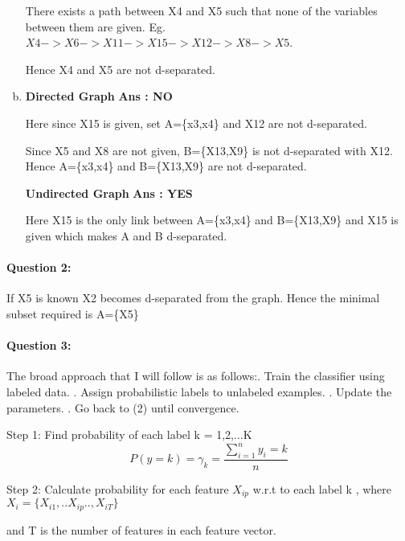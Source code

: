 \documentclass[letterpaper,11pt]{article}
\begin{document}
\begin{enumerate}[(a)]
There exists a path between X4 and X5 such that none of the variables between them are given.
Eg. $X4 -> X6 -> X11 -> X15 -> X12 -> X8 -> X5$.

Hence X4 and X5 are not d-separated.

\item
\textbf{Directed Graph}
\newline
\textbf{Ans : NO}
\newline

Here since X15 is given, set A=\{x3,x4\} and X12 are not d-separated.

Since X5 and X8 are not given, B=\{X13,X9\} is not d-separated with X12.
Hence A=\{x3,x4\} and B=\{X13,X9\} are not d-separated.

\textbf{Undirected Graph}
\newline
\textbf{Ans : YES}
\newline

Here X15 is the only link between A=\{x3,x4\} and B=\{X13,X9\} and X15 is given which makes A and B d-separated.

\end{enumerate}

\paragraph{Question 2:} 

If X5 is known X2 becomes d-separated from the graph.
Hence the minimal subset required is A=\{X5\}

\paragraph{Question 3:} 

The broad approach that I will follow is as follows:. Train the classifier using labeled data. . Assign probabilistic labels to unlabeled examples. . Update the parameters. . Go back to (2) until convergence.

Step 1:
Find probability of each label k = 1,2,...K 
\[
P(y = k) = \gamma_k = \frac{\sum_{i=1}^{n}y_i = k}{n} 
\]

Step 2: Calculate probability for each feature $X_{ip}$ w.r.t to each label k , where 
$X_i = \{X_{i1},..X_{ip}..,X_{iT}\}$

and T is the number of features in each feature vector.
\end{document}
